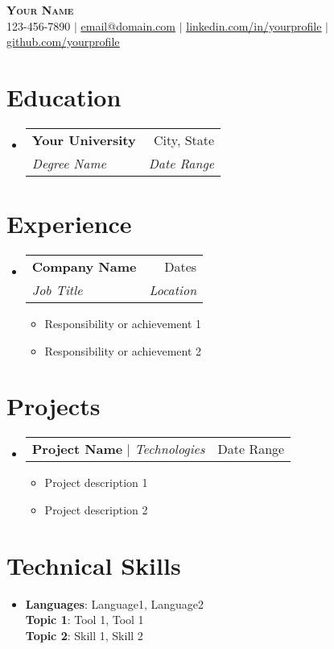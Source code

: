 \documentclass[letterpaper,11pt]{article}
\makeatletter
\newcommand{\resumeItem}[1]{
\item\small{
{#1 \vspace{-2pt}}
}
}
\newcommand{\resumeSubheading}[4]{
\vspace{-2pt}\item
\begin{tabular*}{0.97\textwidth}[t]{l@{\extracolsep{\fill}}r}
\textbf{#1} & #2 \\
\textit{\small#3} & \textit{\small #4} \\
\end{tabular*}\vspace{-7pt}
}
\newcommand{\resumeProjectHeading}[2]{
\item
\begin{tabular*}{0.97\textwidth}{l@{\extracolsep{\fill}}r}
\small#1 & #2 \\
\end{tabular*}\vspace{-7pt}
}
\newcommand{\resumeSubHeadingListStart}{\begin{itemize}[leftmargin=0.15in, label={}]}
\newcommand{\resumeSubHeadingListEnd}{\end{itemize}}
\newcommand{\resumeItemListStart}{\begin{itemize}}
\newcommand{\resumeItemListEnd}{\end{itemize}\vspace{-5pt}}
\makeatother
\begin{document}
\begin{center}
\textbf{\Huge \scshape Your Name} \\ \vspace{1pt}
\small 123-456-7890 $|$ \href{mailto:email@domain.com}{\underline{email@domain.com}} $|$
\href{https://linkedin.com/in/...}{\underline{linkedin.com/in/yourprofile}} $|$
\href{https://github.com/...}{\underline{github.com/yourprofile}}
\end{center}


\section{Education}
\resumeSubHeadingListStart
\resumeSubheading{Your University}{City, State}{Degree Name}{Date Range}
\resumeSubHeadingListEnd

\section{Experience}
\resumeSubHeadingListStart
\resumeSubheading{Company Name}{Dates}{Job Title}{Location}
\resumeItemListStart
\resumeItem{Responsibility or achievement 1}
\resumeItem{Responsibility or achievement 2}
\resumeItemListEnd
\resumeSubHeadingListEnd

\section{Projects}
\resumeSubHeadingListStart
\resumeProjectHeading{\textbf{Project Name} $|$ \emph{Technologies}}{Date Range}
\resumeItemListStart
\resumeItem{Project description 1}
\resumeItem{Project description 2}
\resumeItemListEnd
\resumeSubHeadingListEnd

\section{Technical Skills} %
\begin{itemize}[leftmargin=0.15in, label={}]
\item{
\textbf{Languages}{: Language1, Language2} \\
\textbf{Topic 1}{: Tool 1, Tool 1} \\
\textbf{Topic 2}{: Skill 1, Skill 2}
} \\
\end{itemize}


\end{document}
